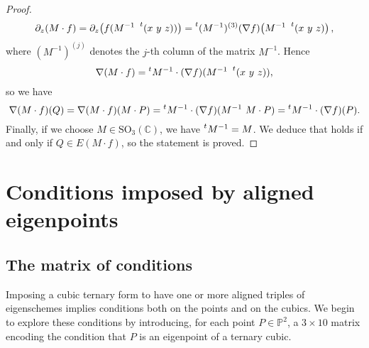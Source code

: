 \documentclass{amsart}
\theoremstyle{plain}
\theoremstyle{definition}
\newcommand{\p}{\mathbb{P}}
\begin{document}
\begin{proof}
\begin{gather*}
\partial_z (M\cdot f) = \partial_z  \bigl( f(M^{-1}  \ \prescript{t} {} (x \ y \ z)) \bigr) = \prescript{t} {}(M^{-1})^{(3)}(\nabla f) \bigl( M^{-1}\   \prescript{t} {} (x \ y \ z) \bigr) \,,
\end{gather*}
%
where $(M^{-1})^{(j)}$ denotes the $j$-th column of the matrix $M^{-1}$. Hence
%
\[
\nabla (M \cdot f) = \prescript{t} {} M^{-1} \cdot (\nabla f) (M^{-1}\   \prescript{t} {} (x \ y \ z)),
\]
%
so we have
%
\[
\nabla (M \cdot f)(Q)=\nabla (M \cdot f)(M \cdot P)=
\prescript{t} {} M^{-1} \cdot (\nabla f) (M^{-1}\   M \cdot P)=\prescript{t} {} M^{-1} \cdot (\nabla f)(P).
\]
%
Finally, if we choose $M \in \mathrm{SO}_3(\mathbb{C})$, we have
$\prescript{t} {} M^{-1}=M$. We deduce that
 holds if and only if $Q \in E(M\cdot f)$, so the statement is proved.
\end{proof}

\section{Conditions imposed by aligned eigenpoints}
\label{conditions}

\subsection{The matrix of conditions}

Imposing a cubic ternary form to have one or more aligned triples of eigenschemes implies conditions both on the points and on the cubics.
We begin to explore these conditions by introducing, for each point
$P \in \p^2$,
a $3 \times 10$ matrix encoding the condition that $P$ is an eigenpoint of a ternary cubic.
\end{document}
